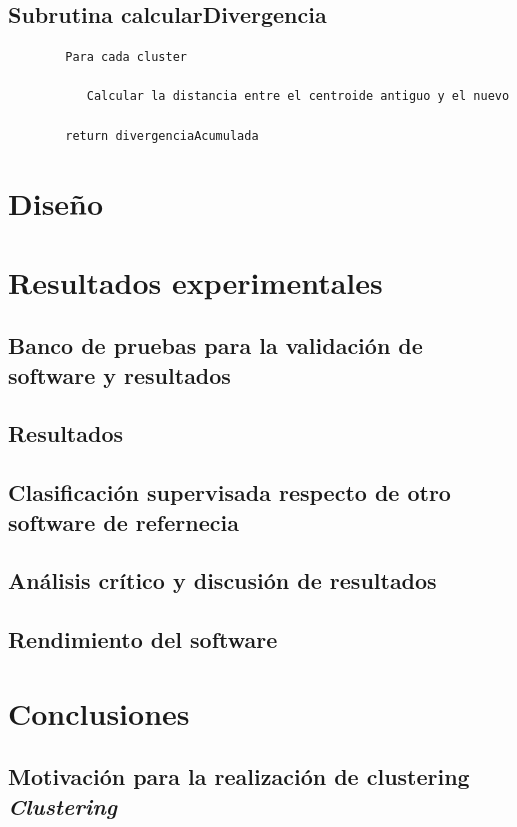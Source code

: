 \documentclass[a4paper]{report}
\begin{document}
	\section{Subrutina calcularDivergencia}
	
		\begin{verbatim}
		Para cada cluster 
		   
		   Calcular la distancia entre el centroide antiguo y el nuevo
		   
		return divergenciaAcumulada
		\end{verbatim}

\chapter{Diseño}



\chapter{Resultados experimentales}

	\section{Banco de pruebas para la validación de software y resultados}
	
	\section{Resultados}
	
	\section{Clasificación supervisada respecto de otro software de refernecia}
	
	\section{Análisis crítico y discusión de resultados}
	
	\section{Rendimiento del software}

\chapter{Conclusiones}

	\section{Motivación para la realización de clustering \textit{Clustering}}
	
\end{document}

